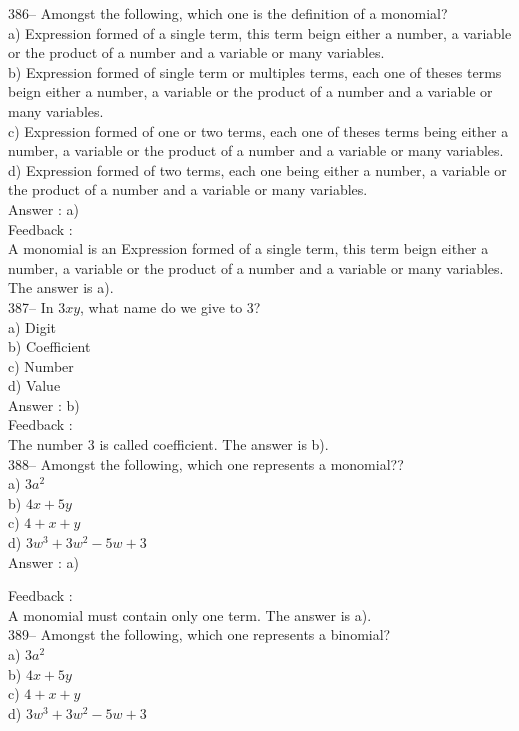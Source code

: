 \documentclass[letterpaper, 12pt]{article}
\begin{document}
386-- Amongst the following, which one is the definition of a monomial?\\
a) Expression formed of a single term, this term beign either a number, a variable or the product of a number and a variable or many variables.\\
b) Expression formed of single term or multiples terms, each one of theses terms beign either a number, a variable or the product of a number and a variable or many variables.\\
c) Expression formed of one or two terms, each one of theses terms being either a number, a variable or the product of a number and a variable or many variables.\\
d) Expression formed of two terms, each one being either a number, a variable or the product of a number and a variable or many variables.\\

Answer : a)\\

Feedback : \\
A monomial is an Expression formed of a single term, this term beign either a number, a variable or the product of a number and a variable or many variables.  The answer is a).\\

387--  In $3xy$, what name do we give to 3?\\
a) Digit\\
b) Coefficient\\
c) Number\\
d) Value\\

Answer : b)\\

Feedback : \\
The number 3 is called coefficient.  The answer is b).\\

388-- Amongst the following, which one represents a monomial??\\
a) $3a^{2}$\\
b) $4x+5y$\\
c) $4+x+y$\\
d) $3w^{3}+3w^{2}-5w+3$\\

Answer : a)

Feedback : \\
A monomial must contain only one term. The answer is a).\\

389-- Amongst the following, which one represents a binomial?\\
a) $3a^{2}$\\
b) $4x+5y$\\
c) $4+x+y$\\
d) $3w^{3}+3w^{2}-5w+3$\\
\end{document}

